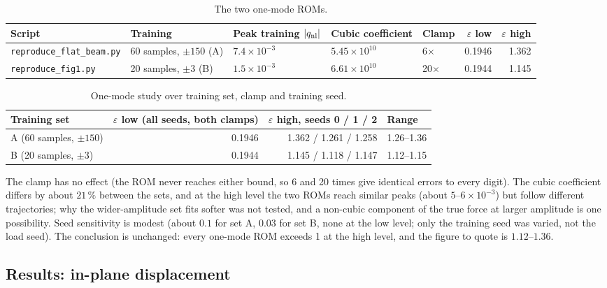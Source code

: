 \begin{table}[tbp]
\centering\footnotesize
\caption{The two one-mode ROMs.}\label{tab:vf-ice-two}
\begin{tabular}{@{}lllllrr@{}}
\toprule
Script & Training & Peak training $|q_{\rm nl}|$ & Cubic coefficient & Clamp & $\varepsilon$ low & $\varepsilon$ high\\
\midrule
\texttt{reproduce\_flat\_beam.py} & 60 samples, $\pm150$ (A) & $7.4\times10^{-3}$ & $5.45\times10^{10}$ & 6$\times$ & 0.1946 & 1.362\\
\texttt{reproduce\_fig1.py} & 20 samples, $\pm3$ (B) & $1.5\times10^{-3}$ & $6.61\times10^{10}$ & 20$\times$ & 0.1944 & 1.145\\
\bottomrule
\end{tabular}
\end{table}

\begin{table}[tbp]
\centering\footnotesize
\caption{One-mode study over training set, clamp and training seed.}\label{tab:vf-ice-seeds}
\begin{tabular}{@{}lrrl@{}}
\toprule
Training set & $\varepsilon$ low (all seeds, both clamps) & $\varepsilon$ high, seeds 0 / 1 / 2 & Range\\
\midrule
A (60 samples, $\pm150$) & 0.1946 & 1.362 / 1.261 / 1.258 & 1.26--1.36\\
B (20 samples, $\pm3$) & 0.1944 & 1.145 / 1.118 / 1.147 & 1.12--1.15\\
\bottomrule
\end{tabular}
\end{table}

The clamp has no effect (the ROM never reaches either bound, so 6 and 20 times give identical errors to every digit). The cubic coefficient differs by about $21\,\%$ between the sets, and at the high level the two ROMs reach similar peaks (about $5$--$6\times10^{-3}$) but follow different trajectories; why the wider-amplitude set fits softer was not tested, and a non-cubic component of the true force at larger amplitude is one possibility. Seed sensitivity is modest (about $0.1$ for set A, $0.03$ for set B, none at the low level; only the training seed was varied, not the load seed). The conclusion is unchanged: every one-mode ROM exceeds 1 at the high level, and the figure to quote is $1.12$--$1.36$.

\subsection*{Results: in-plane displacement}


